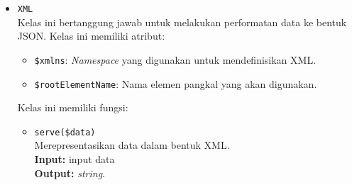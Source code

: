 \begin{itemize}
        \item \texttt{XML} \\
            Kelas ini bertanggung jawab untuk melakukan performatan data ke bentuk JSON.
            Kelas ini memiliki atribut:
            \begin{itemize}
                \item \texttt{\$xmlns}: \textit{Namespace} yang digunakan untuk mendefinisikan XML.
                \item \texttt{\$rootElementName}: Nama elemen pangkal yang akan digunakan.
            \end{itemize}
            Kelas ini memiliki fungsi:
            \begin{itemize}
                \item \texttt{serve(\$data)} \\
                    Merepresentasikan data dalam bentuk XML.\\
                    \textbf{Input:} input data\\
                    \textbf{Output:} \textit{string}.
            \end{itemize}
    \end{itemize}
    
